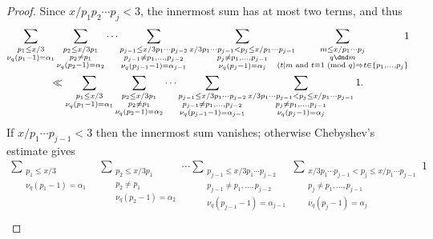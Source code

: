 \documentclass[12pt,reqno]{amsart}
\theoremstyle{definition}
\renewcommand{\mod}[1]{{\ifmmode\text{\rm\ (mod~$#1$)}\else\discretionary{}{}{\hbox{ }}\rm(mod~$#1$)\fi}}
\begin{document}
\begin{proof}
Since $x/p_1p_2\cdots p_j<3$, the innermost sum has at most two terms, and thus
\begin{multline*}
\sum_{\substack{p_1\le x/3 \\ \nu_q(p_1-1)=\alpha_1}}\sum_{\substack{p_2\le x/3p_1\\p_2\ne p_1\\\nu_q(p_2-1)=\alpha_2}}\cdots \sum_{\substack{p_{j-1}\le x/3p_1\cdots p_{j-2} \\ p_{j-1}\ne p_1,\ldots,p_{j-2} \\ \nu_q(p_{j-1}-1)=\alpha_{j-1}}} \sum_{\substack{x/3p_1\cdots p_{j-1}<p_j\le x/p_1\cdots p_{j-1}\\p_j\ne p_1,\ldots,p_{j-1}\\\nu_q(p_j-1)=\alpha_j}} \hskip-7mm \sum_{\substack{m\le x/p_1\cdots p_j\\q\dnd m\\ (t\mid m\text{ and }t\equiv1\mod q \Rightarrow t\in\{p_1,\dots,p_j\}}} \hskip-2mm 1 \\
\ll \sum_{\substack{p_1\le x/3\\\nu_q(p_1-1)=\alpha_1}}\sum_{\substack{p_2\le x/3p_1\\p_2\ne p_1\\\nu_q(p_2-1)=\alpha_2}}\cdots \sum_{\substack{p_{j-1}\le x/3p_1\cdots p_{j-2} \\ p_{j-1}\ne p_1,\ldots,p_{j-2} \\ \nu_q(p_{j-1}-1)=\alpha_{j-1}}} \sum_{\substack{x/3p_1\cdots p_{j-1}<p_j\le x/p_1\cdots p_{j-1}\\p_j\ne p_1,\ldots,p_{j-1}\\\nu_q(p_j-1)=\alpha_j}} 1.
\end{multline*}
If $x/p_1\cdots p_{j-1} < 3$ then the innermost sum vanishes; otherwise Chebyshev's estimate gives
\begin{align*}
\sum_{\substack{p_1\le x/3\\\nu_q(p_1-1)=\alpha_1}} & \sum_{\substack{p_2\le x/3p_1\\p_2\ne p_1\\\nu_q(p_2-1)=\alpha_2}}\cdots \sum_{\substack{p_{j-1}\le x/3p_1\cdots p_{j-2}\\p_{j-1}\ne p_1,\ldots,p_{j-2}\\\nu_q(p_{j-1}-1)=\alpha_{j-1}}} \sum_{\substack{x/3p_1\cdots p_{j-1}<p_j\le x/p_1\cdots p_{j-1}\\p_j\ne p_1,\ldots,p_{j-1}\\\nu_q(p_j-1)=\alpha_j}}1\\

\end{align*}
\end{proof}
\end{document}
